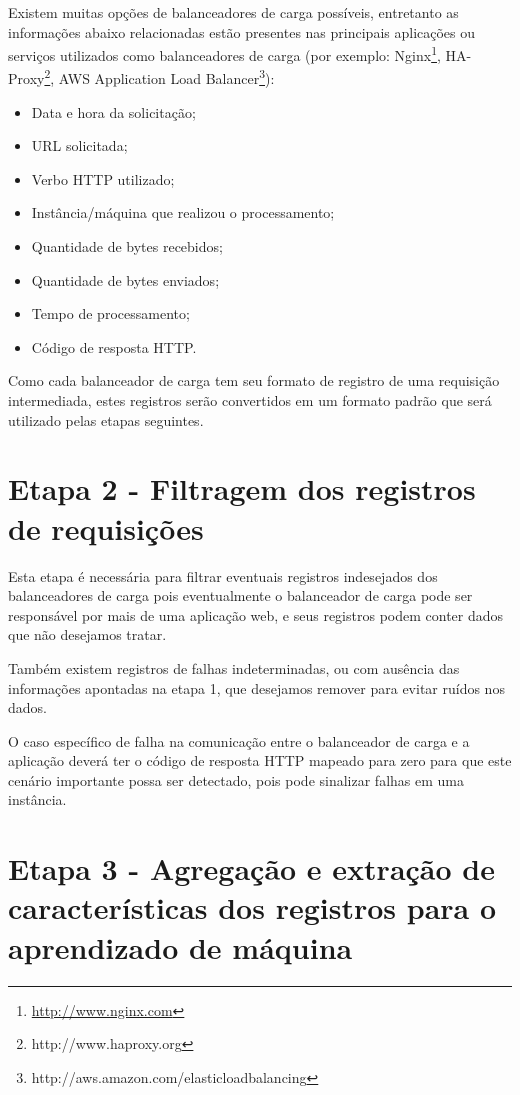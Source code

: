 Existem muitas opções de balanceadores de carga possíveis, entretanto as informações
abaixo relacionadas estão presentes nas principais aplicações ou serviços utilizados
como balanceadores de carga (por exemplo: Nginx\footnote[8]{\url{http://www.nginx.com}},
HA-Proxy\footnote[9]{http://www.haproxy.org}, AWS Application Load 
Balancer\footnote[10]{http://aws.amazon.com/elasticloadbalancing}):

\begin{itemize}
  \item Data e hora da solicitação;
  \item URL solicitada;
  \item Verbo HTTP utilizado;
  \item Instância/máquina que realizou o processamento;
  \item Quantidade de bytes recebidos;
  \item Quantidade de bytes enviados;
  \item Tempo de processamento;
  \item Código de resposta HTTP.
\end{itemize}

Como cada balanceador de carga tem seu formato de registro de uma requisição
intermediada, estes registros serão convertidos em um formato padrão que será
utilizado pelas etapas seguintes.

\section{Etapa 2 - Filtragem dos registros de requisições}
\label{sec:etapa-2}

Esta etapa é necessária para filtrar eventuais registros indesejados dos
balanceadores de carga pois eventualmente o balanceador de carga pode ser
responsável por mais de uma aplicação web, e seus registros podem conter
dados que não desejamos tratar.

Também existem registros de falhas indeterminadas, ou com ausência das
informações apontadas na etapa 1, que desejamos remover para evitar ruídos
nos dados.

O caso específico de falha na comunicação entre o balanceador de carga e a
aplicação deverá ter o código de resposta HTTP mapeado para zero para que
este cenário importante possa ser detectado, pois pode sinalizar falhas em
uma instância.

\section{Etapa 3 - Agregação e extração de características dos registros
         para o aprendizado de máquina}
\label{sec:etapa-3}

